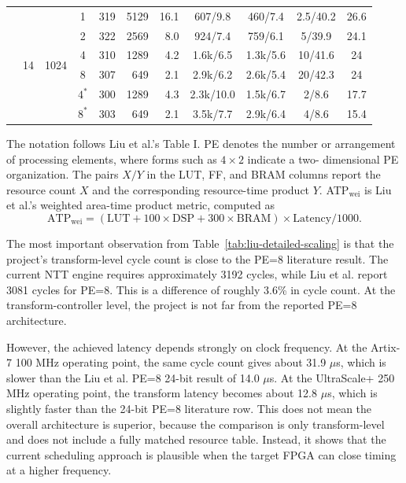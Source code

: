 \documentclass[a4paper, 12pt, titlepage]{article}
\begin{document}
\begin{table}[H]
{\begin{tabular}{|c|c|c|c|r|r|r|c|c|c|c|}
\hline
\multirow{6}{*}{\cite{area-efficient}} & \multirow{6}{*}{14} & \multirow{6}{*}{1024} & 1 & 319 & 5129 & 16.1 & 607/9.8 & 460/7.4 & 2.5/40.2 & 26.6 \\
\cline{4-11}
& & & 2 & 322 & 2569 & 8.0 & 924/7.4 & 759/6.1 & 5/39.9 & 24.1 \\
\cline{4-11}
& & & 4 & 310 & 1289 & 4.2 & 1.6k/6.5 & 1.3k/5.6 & 10/41.6 & 24 \\
\cline{4-11}
& & & 8 & 307 & 649 & 2.1 & 2.9k/6.2 & 2.6k/5.4 & 20/42.3 & 24 \\
\cline{4-11}
& & & \(4^*\) & 300 & 1289 & 4.3 & 2.3k/10.0 & 1.5k/6.7 & 2/8.6 & 17.7 \\
\cline{4-11}
& & & \(8^*\) & 303 & 649 & 2.1 & 3.5k/7.7 & 2.9k/6.4 & 4/8.6 & 15.4 \\
\hline
\end{tabular}%
}
\vspace{2pt}
\begin{minipage}{0.96\textwidth}
\scriptsize
The notation follows Liu et al.'s Table I. PE denotes the number or arrangement
of processing elements, where forms such as \(4{\times}2\) indicate a two-
dimensional PE organization. The pairs \(X/Y\) in the LUT, FF, and BRAM columns
report the resource count \(X\) and the corresponding resource-time product
\(Y\). ATP\(_{\mathrm{wei}}\) is Liu et al.'s weighted area-time product metric,
computed as
\[
\mathrm{ATP}_{\mathrm{wei}} =
(\mathrm{LUT} + 100 \times \mathrm{DSP} + 300 \times \mathrm{BRAM})
\times \mathrm{Latency}/1000 .
\]
\end{minipage}
\end{table}

The most important observation from Table~\ref{tab:liu-detailed-scaling} is that the
project's transform-level cycle count is close to the PE=8 literature result.
The current NTT engine requires approximately 3192 cycles, while Liu et al.
report 3081 cycles for PE=8. This is a difference of roughly 3.6\% in cycle
count. At the transform-controller level, the project is not far from
the reported PE=8 architecture.

However, the achieved latency depends strongly on clock frequency. At the
Artix-7 100 MHz operating point, the same cycle count gives about 31.9 $\mu$s,
which is slower than the Liu et al. PE=8 24-bit result of 14.0 $\mu$s. At the
UltraScale+ 250 MHz operating point, the transform latency becomes about
12.8 $\mu$s, which is slightly faster than the 24-bit PE=8 literature row. This
does not mean the overall architecture is superior, because the comparison is
only transform-level and does not include a fully matched resource table.
Instead, it shows that the current scheduling approach is plausible when the
target FPGA can close timing at a higher frequency.
\end{document}
